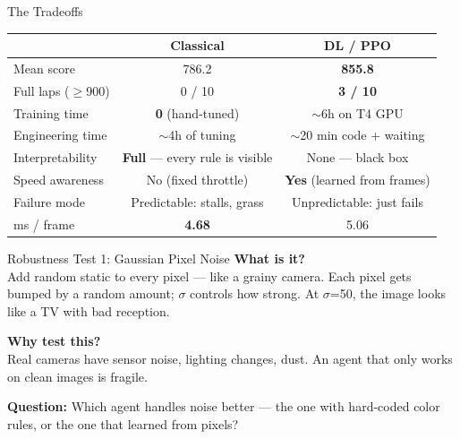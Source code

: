 \documentclass[aspectratio=169, 12pt]{beamer}
\begin{document}
\begin{frame}{The Tradeoffs}
\centering
\begin{tabular}{lcc}
\toprule
 & \textcolor{classical}{\textbf{Classical}} & \textcolor{dlred}{\textbf{DL / PPO}} \\
\midrule
Mean score & 786.2 & \textbf{855.8} \\
Full laps ($\geq$900) & 0 / 10 & \textbf{3 / 10} \\
Training time & \textbf{0} (hand-tuned) & $\sim$6h on T4 GPU \\
Engineering time & $\sim$4h of tuning & $\sim$20 min code + waiting \\
Interpretability & \textbf{Full} --- every rule is visible & None --- black box \\
Speed awareness & No (fixed throttle) & \textbf{Yes} (learned from frames) \\
Failure mode & Predictable: stalls, grass & Unpredictable: just fails \\
ms / frame & \textbf{4.68} & 5.06 \\
\bottomrule
\end{tabular}
\end{frame}

\begin{frame}{Robustness Test 1: Gaussian Pixel Noise}
\textbf{What is it?}\\[0.3em]
Add random static to every pixel --- like a grainy camera.
Each pixel gets bumped by a random amount; $\sigma$ controls how strong.
At $\sigma$=50, the image looks like a TV with bad reception.

\vspace{0.8em}
\textbf{Why test this?}\\[0.3em]
Real cameras have sensor noise, lighting changes, dust.
An agent that only works on clean images is fragile.

\vspace{0.8em}
\textbf{Question:} Which agent handles noise better --- the one with hard-coded color rules, or the one that learned from pixels?
\end{frame}
\end{document}
